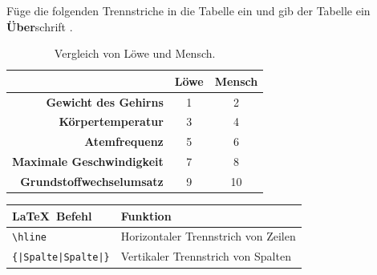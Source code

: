 \documentclass["WS\space 16-17\space -\space LaTeX-Kurs\space -\space Praesentation\space -\space 2.tex"]{subfiles}
\begin{document}
\begin{frame}[fragile]
	\begin{Aufgabe}
		Füge die folgenden Trennstriche in die Tabelle ein und gib der Tabelle ein \textbf{Über}schrift \textrm{}.
	\end{Aufgabe}
	\begin{outputbox}
		\vspace{-0.5cm}
		\begin{center}
\begin{table}[htbp]
	\caption{Vergleich von Löwe und Mensch.}
	\centering
	\begin{tabular}{r|cc}
		\hline 
		\textbf{} & \textbf{Löwe} & \textbf{Mensch} \\ \hline  
		\textbf{Gewicht des Gehirns} & 1 & 2 \\  
		\textbf{Körpertemperatur} & 3 & 4 \\  
		\textbf{Atemfrequenz} & 5 & 6 \\ 
		\textbf{Maximale Geschwindigkeit} & 7 & 8 \\  
		\textbf{Grundstoffwechselumsatz} & 9 & 10 \\ \hline
	\end{tabular} 
	\label{}
\end{table}
		\end{center}

		\vspace{-0.2cm}
	\end{outputbox}
	
	\btVFill\Befehle
	\begin{center}
		\begin{tabular}{ll}
			\toprule
			\LaTeX\ Befehl								&	Funktion								\\ \midrule
			\lstinline|\hline|							&	Horizontaler Trennstrich von Zeilen				\\
			\lstinline/{|Spalte|Spalte|}/								&	Vertikaler Trennstrich von Spalten					\\
			\bottomrule
		\end{tabular}
	\end{center}
	\vspace{0.1cm}
\end{frame}
\end{document}
